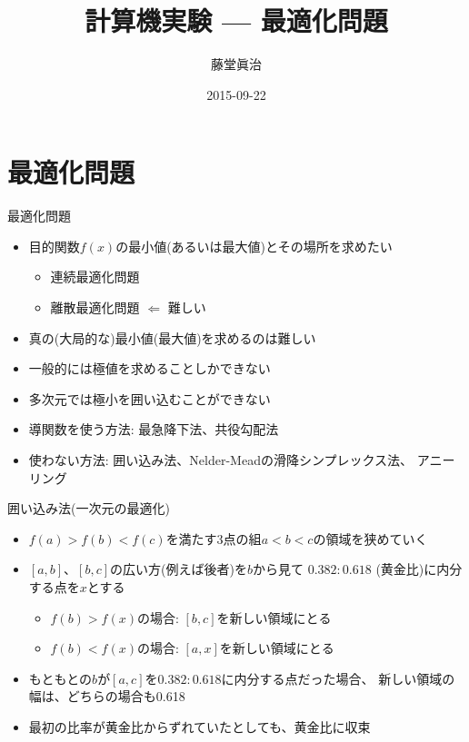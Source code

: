 \documentclass[dvipdfmx]{beamer}
\title{計算機実験 --- 最適化問題}
\author{藤堂眞治}
\date{2015-09-22}
\begin{document}

\begin{frame}
  \titlepage
  \tableofcontents
\end{frame}

\section{最適化問題}

\begin{frame}[t,fragile]{最適化問題}
  \begin{itemize}
    \setlength{\itemsep}{1em}
  \item 目的関数$f(x)$の最小値(あるいは最大値)とその場所を求めたい
    \begin{itemize}
    \item 連続最適化問題
    \item 離散最適化問題 $\Leftarrow$ 難しい
    \end{itemize}
  \item 真の(大局的な)最小値(最大値)を求めるのは難しい
  \item 一般的には極値を求めることしかできない
  \item 多次元では極小を囲い込むことができない
  \item 導関数を使う方法: 最急降下法、共役勾配法
  \item 使わない方法: 囲い込み法、Nelder-Meadの滑降シンプレックス法、
    アニーリング
  \end{itemize}
\end{frame}

\begin{frame}[t,fragile]{囲い込み法(一次元の最適化)}
  \begin{itemize}
    \setlength{\itemsep}{1em}
  \item $f(a) > f(b) < f(c)$を満たす3点の組$a < b < c$の領域を狭めていく
  \item $[a,b]$、$[b,c]$の広い方(例えば後者)を$b$から見て
    $0.382:0.618$ (黄金比)に内分する点を$x$とする
    \begin{itemize}
    \item $f(b) > f(x)$の場合: $[b,c]$を新しい領域にとる
    \item $f(b) < f(x)$の場合: $[a,x]$を新しい領域にとる
    \end{itemize}
  \item もともとの$b$が$[a,c]$を$0.382:0.618$に内分する点だった場合、
    新しい領域の幅は、どちらの場合も0.618
  \item 最初の比率が黄金比からずれていたとしても、黄金比に収束
  \end{itemize}
\end{frame}
\end{document}
